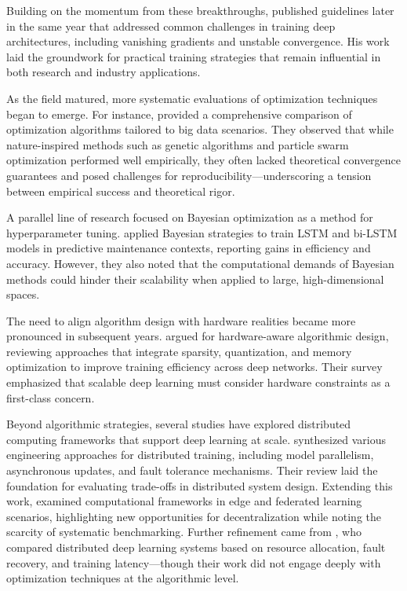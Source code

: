 \documentclass[acmsmall]{acmart}
\begin{document}
Building on the momentum from these breakthroughs, \citet{bengio2012practical} published guidelines later in the same year that addressed common challenges in training deep architectures, including vanishing gradients and unstable convergence. His work laid the groundwork for practical training strategies that remain influential in both research and industry applications.

As the field matured, more systematic evaluations of optimization techniques began to emerge. For instance, \citet{ben2019demystifying} provided a comprehensive comparison of optimization algorithms tailored to big data scenarios. They observed that while nature-inspired methods such as genetic algorithms and particle swarm optimization performed well empirically, they often lacked theoretical convergence guarantees and posed challenges for reproducibility—underscoring a tension between empirical success and theoretical rigor.

A parallel line of research focused on Bayesian optimization as a method for hyperparameter tuning. \citet{thoppil2022bayesian} applied Bayesian strategies to train LSTM and bi-LSTM models in predictive maintenance contexts, reporting gains in efficiency and accuracy. However, they also noted that the computational demands of Bayesian methods could hinder their scalability when applied to large, high-dimensional spaces.

The need to align algorithm design with hardware realities became more pronounced in subsequent years. \citet{capra2020hardware} argued for hardware-aware algorithmic design, reviewing approaches that integrate sparsity, quantization, and memory optimization to improve training efficiency across deep networks. Their survey emphasized that scalable deep learning must consider hardware constraints as a first-class concern.

Beyond algorithmic strategies, several studies have explored distributed computing frameworks that support deep learning at scale. \citet{mayer2020scalable} synthesized various engineering approaches for distributed training, including model parallelism, asynchronous updates, and fault tolerance mechanisms. Their review laid the foundation for evaluating trade-offs in distributed system design. Extending this work, \citet{yan2023computational} examined computational frameworks in edge and federated learning scenarios, highlighting new opportunities for decentralization while noting the scarcity of systematic benchmarking. Further refinement came from \citet{zhang2023distributed}, who compared distributed deep learning systems based on resource allocation, fault recovery, and training latency—though their work did not engage deeply with optimization techniques at the algorithmic level.
\end{document}
